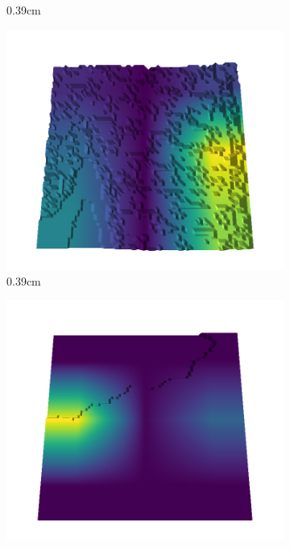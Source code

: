 \documentclass[../document.tex]{subfiles}
\begin{document}
\begin{figure}[H]
\begin{subfigure}[b]{0.242\linewidth}
    \caption{0.39cm}
    \end{subfigure}
    \begin{subfigure}[b]{0.242\linewidth}
    \includegraphics[width=\linewidth]{../img/5/quarry/best/64-patch-3d-majavi-colormap-80.png}
    \caption{0.39cm}
    \end{subfigure}
    \begin{subfigure}[b]{0.242\linewidth}
    \includegraphics[width=\linewidth]{../img/5/quarry/best/67-patch-3d-majavi-colormap-85.png}

\end{subfigure}
\end{figure}
\end{document}
